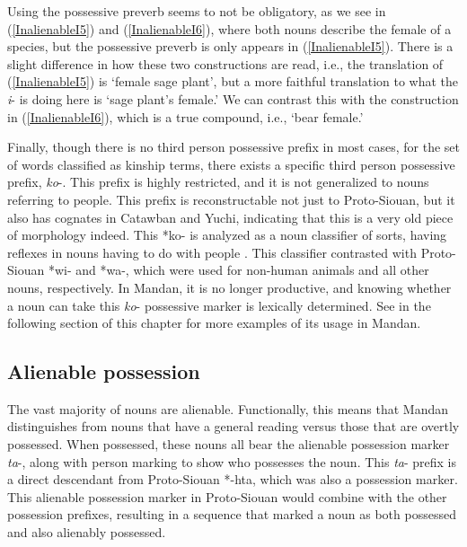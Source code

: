 Using the possessive preverb seems to not be obligatory, as we see in (\ref{InalienableI5}) and (\ref{InalienableI6}), where both nouns describe the female of a species, but the possessive preverb is only appears in (\ref{InalienableI5}). There is a slight difference in how these two constructions are read, i.e., the translation of (\ref{InalienableI5}) is `female sage plant', but a more faithful translation to what the \textit{i}- is doing here is `sage plant's female.' We can contrast this with the construction in (\ref{InalienableI6}), which is a true compound, i.e., `bear female.'

Finally, though there is no third person possessive prefix in most cases, for the set of words classified as kinship terms, there exists a specific third person possessive prefix, \textit{ko}-. This prefix is highly restricted, and it is not generalized to nouns referring to people. This prefix is reconstructable not just to Proto-Siouan, but it also has cognates in Catawban and Yuchi, indicating that this is a very old piece of morphology indeed. This *ko- is analyzed as a noun classifier of sorts, having reflexes in nouns having to do with people \citep[24ff]{kasak2016}. This classifier contrasted with Proto-Siouan *wi- and *wa-, which were used for non-human animals and all other nouns, respectively. In Mandan, it is no longer productive, and knowing whether a noun can take this \textit{ko}- possessive marker is lexically determined. See  in the following section of this chapter for more examples of its usage in Mandan.

\subsection{Alienable possession}\label{SubSecAlienable}

The vast majority of nouns are alienable. Functionally, this means that Mandan distinguishes from nouns that have a general reading versus those that are overtly possessed. When possessed, these nouns all bear the alienable possession marker \textit{ta}-, along with person marking to show who possesses the noun. This \textit{ta}- prefix is a direct descendant from Proto-Siouan *-hta, which was also a possession marker. This alienable possession marker in Proto-Siouan would combine with the other possession prefixes, resulting in a sequence that marked a noun as both possessed and also alienably possessed. 

